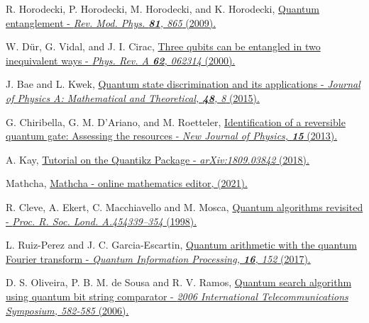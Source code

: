 \documentclass[a4paper,twocolumn,11pt,unpublished]{quantumarticle}
\begin{document}
\begin{thebibliography}{39}
  R. Horodecki, P. Horodecki, M. Horodecki, and K. Horodecki,
  \href{https://doi.org/10.1103/RevModPhys.81.865}{Quantum entanglement - \textit{Rev. Mod. Phys. \textbf{81}, 865} (2009).}

   W. Dür, G. Vidal, and J. I. Cirac,
  \href{https://doi.org/10.1103/PhysRevA.62.062314}{Three qubits can be entangled in two inequivalent ways - \textit{Phys. Rev. A \textbf{62}, 062314} (2000).}
  
  J. Bae and L. Kwek,
  \href{https://doi.org/10.1088/1751-8113/48/8/083001}{Quantum state discrimination and its applications - \textit{Journal of Physics A: Mathematical and Theoretical, \textbf{48}, 8} (2015).}
  
   G. Chiribella, G. M. D'Ariano, and M. Roetteler,
  \href{https://doi.org/10.1088/1367-2630/15/10/103019}{Identification of a reversible quantum gate: Assessing the resources - \textit{New Journal of Physics, \textbf{15}} (2013).}

   A. Kay,
  \href{https://arxiv.org/abs/1809.03842}{Tutorial on the Quantikz Package - \textit{arXiv:1809.03842} (2018).}
  
   Mathcha,
  \href{http://www.mathcha.io}{Mathcha - online mathematics editor, (2021).}
  
   R. Cleve, A. Ekert, C. Macchiavello and M. Mosca,
  \href{https://doi.org/10.1098/rspa.1998.0164}{Quantum algorithms revisited - \textit{Proc. R. Soc. Lond. A.454339–354} (1998).}
  
   L. Ruiz-Perez and J. C. Garcia-Escartin,
  \href{https://doi.org/10.1007/s11128-017-1603-1}{Quantum arithmetic with the quantum Fourier transform - \textit{Quantum Information Processing, \textbf{16}, 152} (2017).}
  
   D. S. Oliveira, P. B. M. de Sousa and R. V. Ramos,
  \href{https://doi.org/10.1109/ITS.2006.4433341}{Quantum search algorithm using quantum bit string comparator - \textit{2006 International Telecommunications Symposium, 582-585} (2006).}
  
  
  

  

\end{thebibliography}
\end{document}
